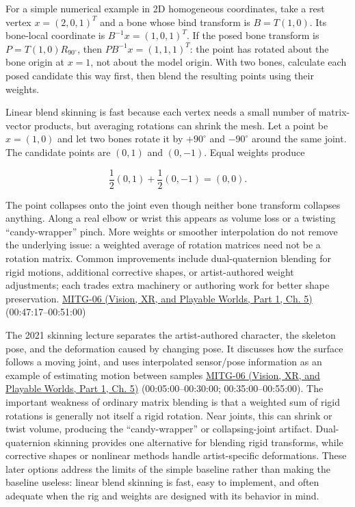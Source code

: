 For a simple numerical example in 2D homogeneous coordinates, take a rest vertex \(x=(2,0,1)^T\) and a bone whose bind transform is \(B=T(1,0)\). Its bone-local coordinate is \(B^{-1}x=(1,0,1)^T\). If the posed bone transform is \(P=T(1,0)R_{90^\circ}\), then \(PB^{-1}x=(1,1,1)^T\): the point has rotated about the bone origin at \(x=1\), not about the model origin. With two bones, calculate each posed candidate this way first, then blend the resulting points using their weights.

Linear blend skinning is fast because each vertex needs a small number of matrix-vector products, but averaging rotations can shrink the mesh. Let a point be \(x=(1,0)\) and let two bones rotate it by \(+90^\circ\) and \(-90^\circ\) around the same joint. The candidate points are \((0,1)\) and \((0,-1)\). Equal weights produce

\[
\frac12(0,1)+\frac12(0,-1)=(0,0).
\]

The point collapses onto the joint even though neither bone transform collapses anything. Along a real elbow or wrist this appears as volume loss or a twisting ``candy-wrapper'' pinch. More weights or smoother interpolation do not remove the underlying issue: a weighted average of rotation matrices need not be a rotation matrix. Common improvements include dual-quaternion blending for rigid motions, additional corrective shapes, or artist-authored weight adjustments; each trades extra machinery or authoring work for better shape preservation. \href{../07-Vision-XR-and-Playable-Worlds-P01/main.pdf\#nameddest=04-visual-computing-ii-ch036-mitg-06---animation-skinningenveloping}{MITG-06 (Vision, XR, and Playable Worlds, Part 1, Ch. 5)} (00:47:17--00:51:00)

The 2021 skinning lecture separates the artist-authored character, the skeleton pose, and the deformation caused by changing pose. It discusses how the surface follows a moving joint, and uses interpolated sensor/pose information as an example of estimating motion between samples \href{../07-Vision-XR-and-Playable-Worlds-P01/main.pdf\#nameddest=04-visual-computing-ii-ch036-mitg-06---animation-skinningenveloping}{MITG-06 (Vision, XR, and Playable Worlds, Part 1, Ch. 5)} (00:05:00--00:30:00; 00:35:00--00:55:00). The important weakness of ordinary matrix blending is that a weighted sum of rigid rotations is generally not itself a rigid rotation. Near joints, this can shrink or twist volume, producing the ``candy-wrapper'' or collapsing-joint artifact. Dual-quaternion skinning provides one alternative for blending rigid transforms, while corrective shapes or nonlinear methods handle artist-specific deformations. These later options address the limits of the simple baseline rather than making the baseline useless: linear blend skinning is fast, easy to implement, and often adequate when the rig and weights are designed with its behavior in mind.


